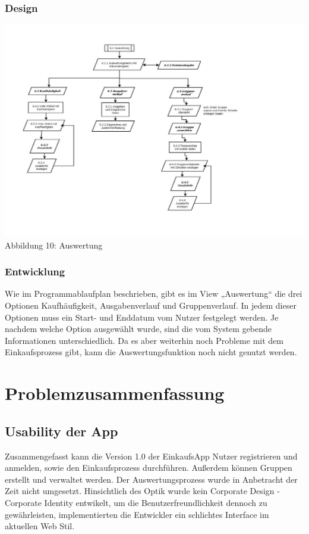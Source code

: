 \documentclass[12pt,a4paper]{article}
\begin{document}
\subsubsection*{Design}
\hspace*{-10mm} 
\includegraphics[trim = 20mm 60mm 0mm 20mm,clip,scale=0.8]{Auswertung.pdf}
\footnotesize Abbildung 10: Auswertung
\normalsize
\\
\subsubsection*{Entwicklung}
Wie im Programmablaufplan beschrieben, gibt es im View „Auswertung“ die drei Optionen Kaufhäufigkeit, Ausgabenverlauf und Gruppenverlauf. In jedem dieser Optionen muss ein Start- und Enddatum vom Nutzer festgelegt werden. Je nachdem welche Option ausgewählt wurde, sind die vom System gebende Informationen unterschiedlich. Da es aber weiterhin noch Probleme mit dem Einkaufsprozess gibt, kann die Auswertungsfunktion noch nicht genutzt werden.
\newpage
\section{Problemzusammenfassung}
\subsection{Usability der App}
Zusammengefasst kann die Version 1.0 der EinkaufsApp Nutzer registrieren und anmelden, sowie den Einkaufsprozess durchführen. Außerdem können Gruppen erstellt und verwaltet werden. Der Auswertungsprozess wurde in Anbetracht der Zeit nicht umgesetzt. Hinsichtlich des Optik wurde kein Corporate Design - Corporate Identity entwikelt, um die Benutzerfreundlichkeit dennoch zu gewährleisten, implementierten die Entwickler ein schlichtes Interface im aktuellen Web Stil.
\newpage
\end{document}
